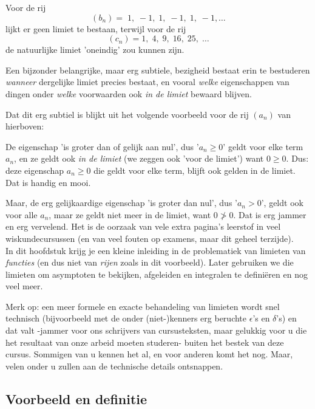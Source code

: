 \documentclass[numbers]{ximera}
\begin{document}
\begin{expandable}
\begin{tcolorbox}[title=Uitwijding: achtergrondinformatie over het hoe en waarom van limieten]
Voor de rij 
\[
(b_n) = \;1,\;-1,\;1,\;-1,\;1,\;-1,\dots
\]
lijkt er geen limiet te bestaan,
terwijl voor de rij 
\[
(c_n) = 1,\;4,\;9,\;16,\;25,\;\dots
\]
de natuurlijke limiet 'oneindig' zou kunnen zijn.

Een bijzonder belangrijke, maar erg subtiele, bezigheid bestaat erin te bestuderen \textit{wanneer} dergelijke limiet precies bestaat, en vooral \textit{welke} eigenschappen van dingen onder \textit{welke} voorwaarden ook \textit{in de limiet} bewaard blijven. 

Dat dit erg subtiel is blijkt uit het volgende voorbeeld voor de rij $(a_n)$ van hierboven:

De eigenschap 'is groter dan of gelijk aan nul', dus '$a_n\geq0$' geldt voor elke term $a_n$, en ze geldt ook \textit{in de limiet} (we zeggen ook 'voor de limiet') want  $0\geq0$. Dus: deze eigenschap $a_n\geq 0$ die geldt voor elke term, blijft ook gelden in de limiet. Dat is handig en mooi. 

Maar, de erg gelijkaardige eigenschap 'is groter dan nul', dus '$a_n>0$', geldt ook voor alle $a_n$, maar ze geldt niet meer in de limiet, want $0\not>0$. Dat is erg jammer en erg vervelend. Het is de oorzaak van vele extra pagina's leerstof in veel wiskundecursussen (en van veel fouten op examens, maar dit geheel terzijde). \\


In dit hoofdstuk krijg je een kleine inleiding in de problematiek van limieten van \textit{functies} (en dus niet van \textit{rijen} zoals in dit voorbeeld). Later gebruiken we die limieten om asymptoten te bekijken, afgeleiden en integralen te definiëren en nog veel meer. 

Merk op: een meer formele en exacte behandeling van limieten wordt snel technisch (bijvoorbeeld met de onder (niet-)kenners erg beruchte $\epsilon$'s en $\delta$'s)  en dat valt -jammer voor ons schrijvers van cursusteksten, maar gelukkig voor u die het resultaat van onze arbeid moeten studeren- buiten het bestek van deze cursus. Sommigen van u kennen het al, en voor anderen komt het nog. Maar, velen onder u zullen aan de technische details ontsnappen.
\end{tcolorbox}
\end{expandable}


\subsection{Voorbeeld en definitie}
\end{document}
